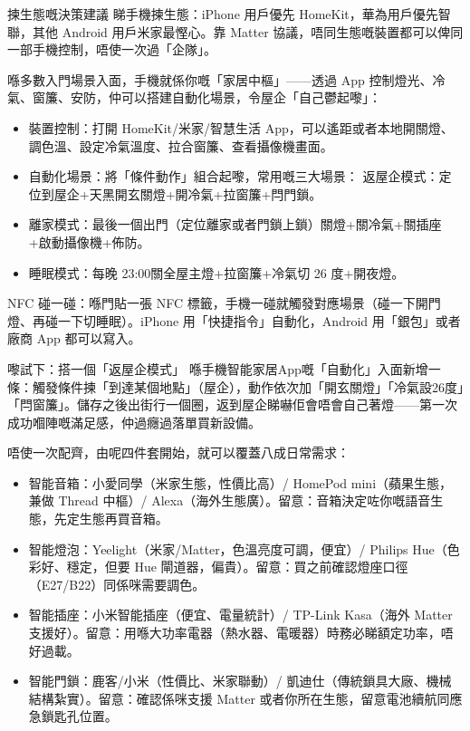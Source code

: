 \begin{tcbinfo}{揀生態嘅決策建議}
睇手機揀生態：iPhone 用戶優先 HomeKit，華為用戶優先智聯，其他 Android 用戶米家最慳心。靠 Matter 協議，唔同生態嘅裝置都可以俾同一部手機控制，唔使一次過「企隊」。

\end{tcbinfo}


喺多數入門場景入面，手機就係你嘅「家居中樞」——透過 App 控制燈光、冷氣、窗簾、安防，仲可以搭建自動化場景，令屋企「自己鬱起嚟」：

\begin{itemize}
  \item 裝置控制：打開 HomeKit/米家/智慧生活 App，可以遙距或者本地開關燈、調色溫、設定冷氣溫度、拉合窗簾、查看攝像機畫面。
  \item 自動化場景：將「條件動作」組合起嚟，常用嘅三大場景： 返屋企模式：定位到屋企+天黑開玄關燈+開冷氣+拉窗簾+閂門鎖。
  \item 離家模式：最後一個出門（定位離家或者門鎖上鎖）關燈+關冷氣+關插座+啟動攝像機+佈防。
  \item 睡眠模式：每晚 23:00關全屋主燈+拉窗簾+冷氣切 26 度+開夜燈。
\end{itemize}

NFC 碰一碰：喺門貼一張 NFC 標籤，手機一碰就觸發對應場景（碰一下開門燈、再碰一下切睡眠）。iPhone 用「快捷指令」自動化，Android 用「銀包」或者廠商 App 都可以寫入。

\begin{tcbpractice}{嚟試下：搭一個「返屋企模式」}
喺手機智能家居App嘅「自動化」入面新增一條：觸發條件揀「到達某個地點」（屋企），動作依次加「開玄關燈」「冷氣設26度」「閂窗簾」。儲存之後出街行一個圈，返到屋企睇嚇佢會唔會自己著燈——第一次成功嗰陣嘅滿足感，仲過癮過落單買新設備。

\end{tcbpractice}


唔使一次配齊，由呢四件套開始，就可以覆蓋八成日常需求：

\begin{itemize}
  \item 智能音箱：小愛同學（米家生態，性價比高）/ HomePod mini（蘋果生態，兼做 Thread 中樞）/ Alexa（海外生態廣）。留意：音箱決定咗你嘅語音生態，先定生態再買音箱。
  \item 智能燈泡：Yeelight（米家/Matter，色溫亮度可調，便宜）/ Philips Hue（色彩好、穩定，但要 Hue 閘道器，偏貴）。留意：買之前確認燈座口徑（E27/B22）同係咪需要調色。
  \item 智能插座：小米智能插座（便宜、電量統計）/ TP-Link Kasa（海外 Matter 支援好）。留意：用喺大功率電器（熱水器、電暖器）時務必睇額定功率，唔好過載。
  \item 智能門鎖：鹿客/小米（性價比、米家聯動）/ 凱迪仕（傳統鎖具大廠、機械結構紮實）。留意：確認係咪支援 Matter 或者你所在生態，留意電池續航同應急鎖匙孔位置。
\end{itemize}

